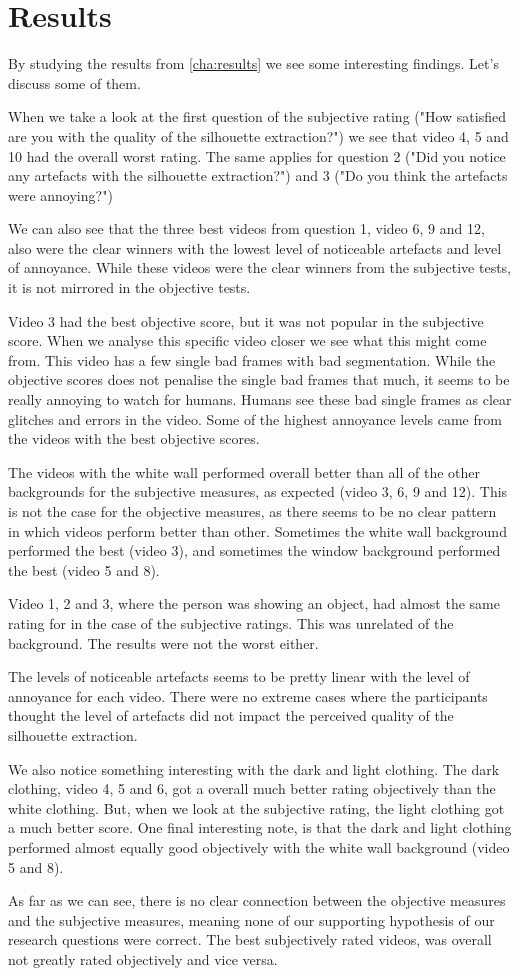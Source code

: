 \section{Results}\label{sec:disc_results}
By studying the results from \autoref{cha:results} we see some interesting findings. Let's discuss some of them.

When we take a look at the first question of the subjective rating ("How satisfied are you with the quality of the silhouette extraction?") we see that video 4, 5 and 10 had the overall worst rating. The same applies for question 2 ("Did you notice any artefacts with the silhouette extraction?") and 3 ("Do you think the artefacts were annoying?")

We can also see that the three best videos from question 1, video 6, 9 and 12, also were the clear winners with the lowest level of noticeable artefacts and level of annoyance. While these videos were the clear winners from the subjective tests, it is not mirrored in the objective tests. 

Video 3 had the best objective score, but it was not popular in the subjective score. When we analyse this specific video closer we see what this might come from. This video has a few single bad frames with bad segmentation. While the objective scores does not penalise the single bad frames that much, it seems to be really annoying to watch for humans. Humans see these bad single frames as clear glitches and errors in the video. Some of the highest annoyance levels came from the videos with the best objective scores. 

The videos with the white wall performed overall better than all of the other backgrounds for the subjective measures, as expected (video 3, 6, 9 and 12). This is not the case for the objective measures, as there seems to be no clear pattern in which videos perform better than other. Sometimes the white wall background performed the best (video 3), and sometimes the window background performed the best (video 5 and 8).

Video 1, 2 and 3, where the person was showing an object, had almost the same rating for in the case of the subjective ratings. This was unrelated of the background. The results were not the worst either.

The levels of noticeable artefacts seems to be pretty linear with the level of annoyance for each video. There were no extreme cases where the participants thought the level of artefacts did not impact the perceived quality of the silhouette extraction.

We also notice something interesting with the dark and light clothing. The dark clothing, video 4, 5 and 6, got a overall much better rating objectively than the white clothing. But, when we look at the subjective rating, the light clothing got a much better score. One final interesting note, is that the dark and light clothing performed almost equally good objectively with the white wall background (video 5 and 8).

As far as we can see, there is no clear connection between the objective measures and the subjective measures, meaning none of our supporting hypothesis of our research questions were correct. The best subjectively rated videos, was overall not greatly rated objectively and vice versa.